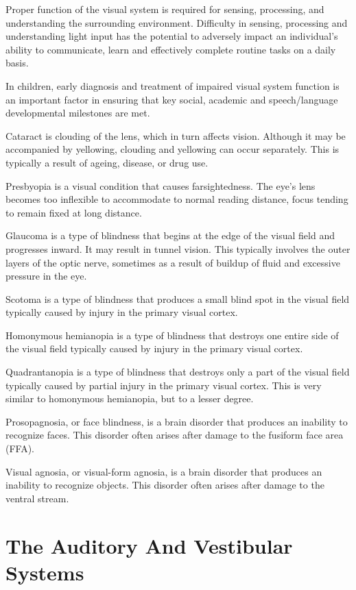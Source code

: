 Proper function of the visual system is required for sensing, processing, and understanding the surrounding environment. Difficulty in sensing, processing and understanding light input has the potential to adversely impact an individual's ability to communicate, learn and effectively complete routine tasks on a daily basis.

In children, early diagnosis and treatment of impaired visual system function is an important factor in ensuring that key social, academic and speech/language developmental milestones are met.

Cataract is clouding of the lens, which in turn affects vision. Although it may be accompanied by yellowing, clouding and yellowing can occur separately. This is typically a result of ageing, disease, or drug use.

Presbyopia is a visual condition that causes farsightedness. The eye's lens becomes too inflexible to accommodate to normal reading distance, focus tending to remain fixed at long distance.

Glaucoma is a type of blindness that begins at the edge of the visual field and progresses inward. It may result in tunnel vision. This typically involves the outer layers of the optic nerve, sometimes as a result of buildup of fluid and excessive pressure in the eye.

Scotoma is a type of blindness that produces a small blind spot in the visual field typically caused by injury in the primary visual cortex.

Homonymous hemianopia is a type of blindness that destroys one entire side of the visual field typically caused by injury in the primary visual cortex.

Quadrantanopia is a type of blindness that destroys only a part of the visual field typically caused by partial injury in the primary visual cortex. This is very similar to homonymous hemianopia, but to a lesser degree.

Prosopagnosia, or face blindness, is a brain disorder that produces an inability to recognize faces. This disorder often arises after damage to the fusiform face area (FFA).

Visual agnosia, or visual-form agnosia, is a brain disorder that produces an inability to recognize objects. This disorder often arises after damage to the ventral stream.

\hypertarget{the-auditory-and-vestibular-systems}{%
\chapter{The Auditory And Vestibular Systems}\label{the-auditory-and-vestibular-systems}}

